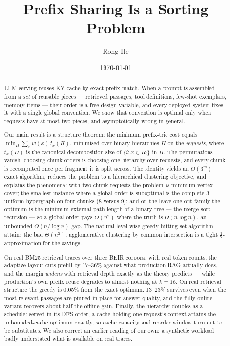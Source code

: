 \documentclass[11pt]{article}
\title{\bf Prefix Sharing Is a Sorting Problem}
\author{Rong He}
\date{\today}
\theoremstyle{plain}
\begin{document}
\maketitle
\begin{abstract}
LLM serving reuses KV cache by exact prefix match. When a prompt is assembled from a \emph{set} of reusable pieces --- retrieved passages, tool definitions, few-shot exemplars, memory items --- their order is a free design variable, and every deployed system fixes it with a single global convention. We show that convention is optimal only when requests have at most two pieces, and asymptotically wrong in general.

Our main result is a structure theorem: the minimum prefix-trie cost equals $\min_H \sum_x w(x)\,t_x(H)$, minimised over binary hierarchies $H$ on the \emph{requests}, where $t_x(H)$ is the canonical-decomposition size of $\{i : x \in R_i\}$ in $H$. The permutations vanish; choosing chunk orders is choosing one hierarchy over requests, and every chunk is recomputed once per fragment it is split across. The identity yields an $O(3^m)$ exact algorithm, reduces the problem to a hierarchical clustering objective, and explains the phenomena: with two-chunk requests the problem \emph{is} minimum vertex cover; the smallest instance where a global order is suboptimal is the complete 3-uniform hypergraph on four chunks (8 versus 9); and on the leave-one-out family the optimum is the minimum external path length of a binary tree --- the merge-sort recursion --- so a global order pays $\Theta(n^2)$ where the truth is $\Theta(n\log n)$, an unbounded $\Theta(n/\log n)$ gap. The natural level-wise greedy hitting-set algorithm attains the bad $\Theta(n^2)$; agglomerative clustering by common intersection is a tight $\tfrac12$-approximation for the savings.

On real BM25 retrieval traces over three BEIR corpora, with real token counts, the adaptive layout cuts prefill by 17--36\% against what production RAG actually does, and the margin \emph{widens} with retrieval depth exactly as the theory predicts --- while production's own prefix reuse degrades to almost nothing at $k=16$. On real retrieval structure the greedy is 0.05\% from the exact optimum. 13--23\% survives even when the most relevant passages are pinned in place for answer quality, and the fully online variant recovers about half the offline gain. Finally, the hierarchy doubles as a schedule: served in its DFS order, a cache holding one request's context attains the unbounded-cache optimum exactly, so cache capacity and reorder window turn out to be substitutes. We also correct an earlier reading of our own: a synthetic workload badly understated what is available on real traces.
\end{abstract}
\end{document}
